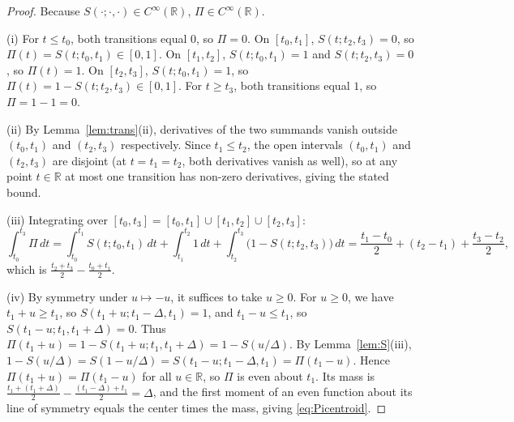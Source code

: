 \documentclass[11pt]{article}
\newcommand{\R}{\mathbb{R}}
\begin{document}
\begin{proof}
Because $S(\cdot; \cdot, \cdot) \in C^\infty(\R)$, $\Pi \in C^\infty(\R)$.

(i) For $t \le t_0$, both transitions equal $0$, so $\Pi = 0$. On $[t_0, t_1]$, $S(t; t_2, t_3) = 0$, so $\Pi(t) = S(t; t_0, t_1) \in [0, 1]$. On $[t_1, t_2]$, $S(t; t_0, t_1) = 1$ and $S(t; t_2, t_3) = 0$, so $\Pi(t) = 1$. On $[t_2, t_3]$, $S(t; t_0, t_1) = 1$, so $\Pi(t) = 1 - S(t; t_2, t_3) \in [0, 1]$. For $t \ge t_3$, both transitions equal $1$, so $\Pi = 1 - 1 = 0$.

(ii) By Lemma~\ref{lem:trans}(ii), derivatives of the two summands vanish outside $(t_0, t_1)$ and $(t_2, t_3)$ respectively. Since $t_1 \le t_2$, the open intervals $(t_0, t_1)$ and $(t_2, t_3)$ are disjoint (at $t=t_1=t_2$, both derivatives vanish as well), so at any point $t \in \R$ at most one transition has non-zero derivatives, giving the stated bound.

(iii) Integrating over $[t_0, t_3] = [t_0, t_1] \cup [t_1, t_2] \cup [t_2, t_3]$:
\[
\int_{t_0}^{t_3} \Pi\,dt = \int_{t_0}^{t_1} S(t; t_0, t_1)\,dt + \int_{t_1}^{t_2} 1\,dt + \int_{t_2}^{t_3} \bigl(1 - S(t; t_2, t_3)\bigr)\,dt = \frac{t_1-t_0}{2} + (t_2-t_1) + \frac{t_3-t_2}{2},
\]
which is $\frac{t_2+t_3}{2} - \frac{t_0+t_1}{2}$.

(iv) By symmetry under $u \mapsto -u$, it suffices to take $u \ge 0$.
For $u \ge 0$, we have $t_1+u \ge t_1$, so $S(t_1+u; t_1-\Delta, t_1) = 1$, and $t_1-u \le t_1$, so $S(t_1-u; t_1, t_1+\Delta) = 0$.
Thus $\Pi(t_1+u) = 1 - S(t_1+u; t_1, t_1+\Delta) = 1 - S(u/\Delta)$.
By Lemma~\ref{lem:S}(iii), $1 - S(u/\Delta) = S(1 - u/\Delta) = S(t_1-u; t_1-\Delta, t_1) = \Pi(t_1-u)$.
Hence $\Pi(t_1+u) = \Pi(t_1-u)$ for all $u \in \R$, so $\Pi$ is even about $t_1$.
Its mass is $\frac{t_1+(t_1+\Delta)}{2} - \frac{(t_1-\Delta)+t_1}{2} = \Delta$, and the first moment of an even function about its line of symmetry equals the center times the mass, giving \eqref{eq:Picentroid}.
\end{proof}



\end{document}
